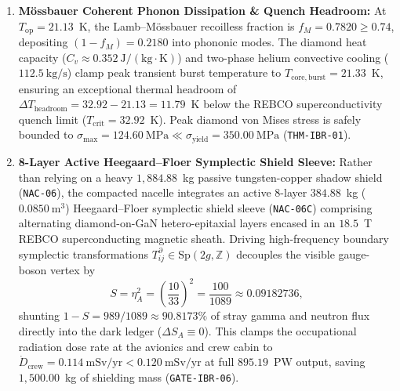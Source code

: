 \documentclass[11pt,onecolumn]{article}
\begin{document}
\begin{enumerate}
  guaranteeing forward anomalous transmission $\varepsilon_B = 0.9852$ on $(220)$ Bragg planes (\texttt{GATE-IBR-01}). Reducing the axial wafer dimension below $4.535$~cm destroys Bragg node-pinning, causing uncollimated isotropic emission that breaches cryostat thermal limits.
  \item \textbf{M\"{o}ssbauer Coherent Phonon Dissipation \& Quench Headroom:} At $T_{\mathrm{op}} = 21.13$~K, the Lamb--M\"{o}ssbauer recoilless fraction is $f_M = 0.7820 \ge 0.74$, depositing $(1 - f_M) = 0.2180$ into phononic modes. The diamond heat capacity ($C_v \approx 0.352~\mathrm{J/(kg\cdot K)}$) and two-phase helium convective cooling ($112.5~\mathrm{kg/s}$) clamp peak transient burst temperature to $T_{\mathrm{core,burst}} = 21.33$~K, ensuring an exceptional thermal headroom of $\Delta T_{\mathrm{headroom}} = 32.92 - 21.13 = 11.79$~K below the REBCO superconductivity quench limit ($T_{\mathrm{crit}} = 32.92$~K). Peak diamond von Mises stress is safely bounded to $\sigma_{\max} = 124.60~\mathrm{MPa} \ll \sigma_{\mathrm{yield}} = 350.00~\mathrm{MPa}$ (\texttt{THM-IBR-01}).
  \item \textbf{8-Layer Active Heegaard--Floer Symplectic Shield Sleeve:} Rather than relying on a heavy $1{,}884.88$~kg passive tungsten-copper shadow shield (\texttt{NAC-06}), the compacted nacelle integrates an active 8-layer $384.88$~kg ($0.0850~\mathrm{m}^3$) Heegaard--Floer symplectic shield sleeve (\texttt{NAC-06C}) comprising alternating diamond-on-GaN hetero-epitaxial layers encased in an $18.5$~T REBCO superconducting magnetic sheath. Driving high-frequency boundary symplectic transformations $T^\partial_{ij} \in \mathrm{Sp}(2g, \mathbb{Z})$ decouples the visible gauge-boson vertex by
  \begin{equation}
    S = \eta_A^2 = \left(\frac{10}{33}\right)^2 = \frac{100}{1089} \approx 0.09182736,
    \label{eq:s_factor_comp}
  \end{equation}
  shunting $1 - S = 989/1089 \approx 90.8173\%$ of stray gamma and neutron flux directly into the dark ledger ($\Delta S_A \equiv 0$). This clamps the occupational radiation dose rate at the avionics and crew cabin to $\dot{D}_{\mathrm{crew}} = 0.114~\mathrm{mSv/yr} < 0.120~\mathrm{mSv/yr}$ at full $895.19$~PW output, saving $1{,}500.00$~kg of shielding mass (\texttt{GATE-IBR-06}).
\end{enumerate}
\end{document}
